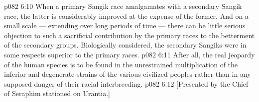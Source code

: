 \vs p082 6:10 \pc When a primary Sangik race amalgamates with a secondary Sangik race, the latter is considerably improved at the expense of the former. And on a small scale --- extending over long periods of time --- there can be little serious objection to such a sacrificial contribution by the primary races to the betterment of the secondary groups. Biologically considered, the secondary Sangiks were in some respects superior to the primary races.
\vs p082 6:11 After all, the real jeopardy of the human species is to be found in the unrestrained multiplication of the inferior and degenerate strains of the various civilized peoples rather than in any supposed danger of their racial interbreeding.
\vsetoff
\vs p082 6:12 [Presented by the Chief of Seraphim stationed on Urantia.]
\quizlink
